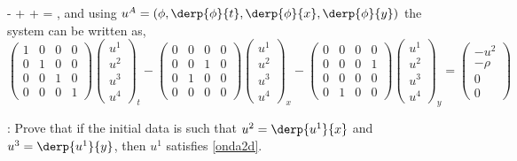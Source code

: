 \beq 
- +  +  = \rho, \label{onda2d} 
\eeq 
and using 
$u^A = (\phi,\derp{\phi}{t},\derp{\phi}{x},\derp{\phi}{y})$ 
the system can be written as, 
{\small
\arraycolsep=2pt
$$
\left(
      \begin{array}{cccc}
      1&0&0&0 \\
      0&1&0&0 \\
      0&0&1&0 \\
      0&0&0&1
      \end{array}
\right)      
\left(
      \begin{array}{c}
      u^1\\u^2\\u^3\\u^4
      \end{array}
\right)_t
-
\left(
      \begin{array}{cccc}
      0&0&0&0 \\
      0&0&1&0 \\
      0&1&0&0 \\
      0&0&0&0
      \end{array}
\right)      
\left(
      \begin{array}{c}
      u^1\\u^2\\u^3\\u^4
      \end{array}
\right)_x
-
\left(
      \begin{array}{cccc}
      0&0&0&0 \\
      0&0&0&1 \\
      0&0&0&0 \\
      0&1&0&0
      \end{array}
\right)      
\left(
      \begin{array}{c}
      u^1\\u^2\\u^3\\u^4
      \end{array}
\right)_y
= 
\left(
      \begin{array}{c}
     - u^2\\-\rho\\0\\0
      \end{array}
\right) 
\nonumber
$$
}
\arraycolsep=5pt
\espa

\ejer: Prove that if the initial data is such that $u^2=\derp{u^1}{x}$ and $u^3=\derp{u^1}{y}$, then $u^1$ satisfies \ref{onda2d}. \espa

